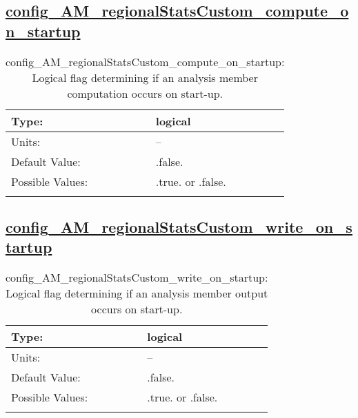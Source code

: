 \subsection[config\_AM\_regionalStatsCustom\_compute\_on\_startup]{\hyperref[sec:nm_tab_AM_regionalStatsCustom]{config\_AM\_regionalStatsCustom\_compute\_on\_startup}}
\label{subsec:nm_sec_config_AM_regionalStatsCustom_compute_on_startup}
\begin{center}
\begin{longtable}{| p{2.0in} || p{4.0in} |}
    \hline
    Type: & logical \\
    \hline
    Units: & -- \\
    \hline
    Default Value: & .false. \\
    \hline
    Possible Values: & .true. or .false. \\
    \hline
    \caption{config\_AM\_regionalStatsCustom\_compute\_on\_startup: Logical flag determining if an analysis member computation occurs on start-up.}
\end{longtable}
\end{center}
\subsection[config\_AM\_regionalStatsCustom\_write\_on\_startup]{\hyperref[sec:nm_tab_AM_regionalStatsCustom]{config\_AM\_regionalStatsCustom\_write\_on\_startup}}
\label{subsec:nm_sec_config_AM_regionalStatsCustom_write_on_startup}
\begin{center}
\begin{longtable}{| p{2.0in} || p{4.0in} |}
    \hline
    Type: & logical \\
    \hline
    Units: & -- \\
    \hline
    Default Value: & .false. \\
    \hline
    Possible Values: & .true. or .false. \\
    \hline
    \caption{config\_AM\_regionalStatsCustom\_write\_on\_startup: Logical flag determining if an analysis member output occurs on start-up.}
\end{longtable}
\end{center}
